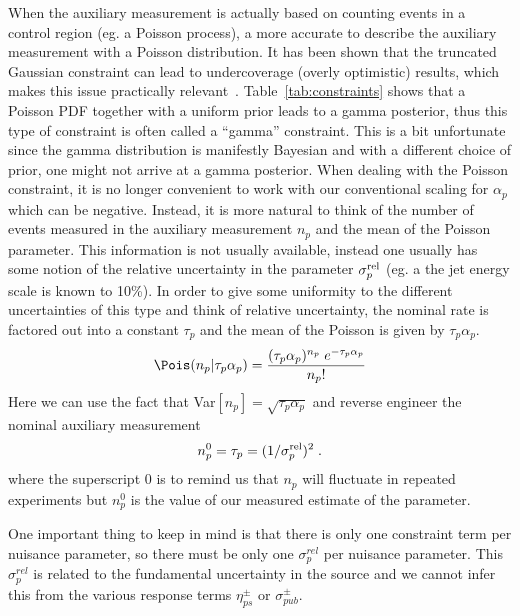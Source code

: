 When the auxiliary measurement is actually based on counting events in a control region (eg. a Poisson process), a more accurate to describe the auxiliary measurement with a Poisson distribution.  It has been shown that the truncated Gaussian constraint can lead to undercoverage (overly optimistic) results, which makes this issue practically relevant~\cite{Cousins:2008zz}.  Table~\ref{tab:constraints} shows that a Poisson PDF together with a uniform prior leads to a gamma posterior, thus this type of constraint is often called a ``gamma'' constraint.  This is a bit unfortunate since the gamma distribution is manifestly Bayesian and with a different choice of prior, one might not arrive at a gamma posterior.  When dealing with the Poisson constraint, it is no longer convenient to work with  our conventional scaling for $\alpha_p$ which can be negative.  Instead, it is more natural to think of the number of events measured in the auxiliary measurement $n_p$ and the mean of the Poisson parameter.  This information is not usually available, instead one usually has some notion of the relative uncertainty in the parameter $\sigma_p^{\rm rel}$ (eg. a the jet energy scale is known to 10\%).  In order to give some uniformity to the different uncertainties of this type and think of relative uncertainty, the nominal rate is factored out into a constant $\tau_p$ and the mean of the Poisson is given by $\tau_p \alpha_p$.  
\begin{equation}
\Pois(n_p | \tau_p \alpha_p) =\frac{ (\tau_p \alpha_p)^{n_p} \; e^{-\tau_p \alpha_p} } {n_p!}
\end{equation}
Here we can use the fact that Var$[n_p]=\sqrt{\tau_p\alpha_p}$ and reverse engineer the nominal auxiliary measurement 
\begin{equation}
n_p^0 =  \tau_p = (1/\sigma_{p}^{\rm rel})^2\; .
\end{equation}
where the superscript $0$ is to remind us that $n_p$ will fluctuate in repeated experiments but $n_p^0$ is the value of our measured estimate of the parameter.


One important thing to keep in mind is that there is only one constraint term per nuisance parameter, so there must be only one $\sigma_p^{rel}$ per nuisance parameter.  This $\sigma_p^{rel}$ is related to the fundamental uncertainty in the source and we cannot infer this from the various response terms $\eta_{ps}^\pm$ or $\sigma_{pub}^\pm$. 


